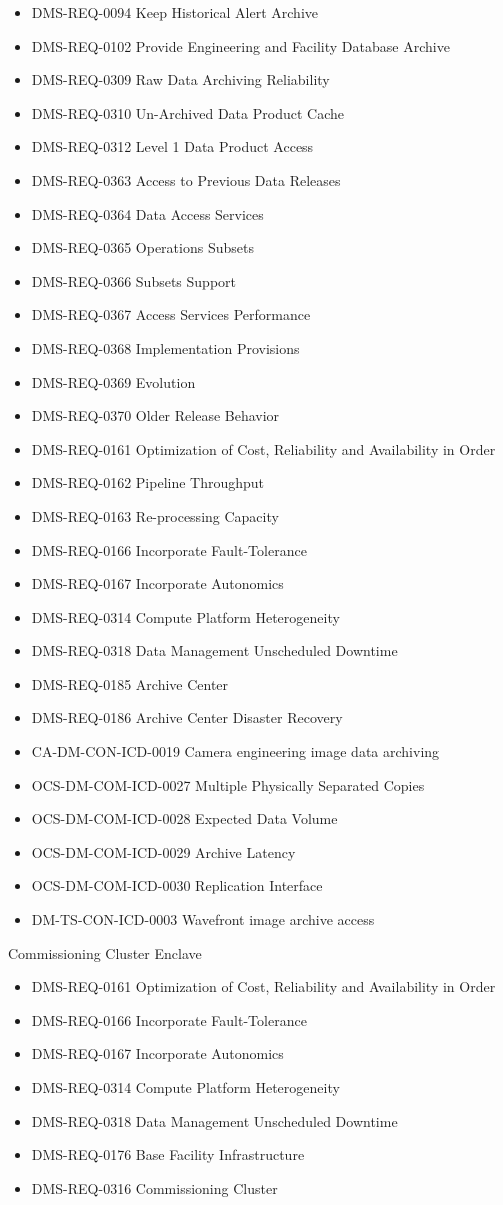 \begin{itemize}
\item DMS-REQ-0094 Keep Historical Alert Archive
\item DMS-REQ-0102 Provide Engineering and Facility Database Archive
\item DMS-REQ-0309 Raw Data Archiving Reliability
\item DMS-REQ-0310 Un-Archived Data Product Cache
\item DMS-REQ-0312 Level 1 Data Product Access
\item DMS-REQ-0363 Access to Previous Data Releases
\item DMS-REQ-0364 Data Access Services
\item DMS-REQ-0365 Operations Subsets
\item DMS-REQ-0366 Subsets Support
\item DMS-REQ-0367 Access Services Performance
\item DMS-REQ-0368 Implementation Provisions
\item DMS-REQ-0369 Evolution
\item DMS-REQ-0370 Older Release Behavior
\item DMS-REQ-0161 Optimization of Cost, Reliability and Availability in Order
\item DMS-REQ-0162 Pipeline Throughput
\item DMS-REQ-0163 Re-processing Capacity
\item DMS-REQ-0166 Incorporate Fault-Tolerance
\item DMS-REQ-0167 Incorporate Autonomics
\item DMS-REQ-0314 Compute Platform Heterogeneity
\item DMS-REQ-0318 Data Management Unscheduled Downtime
\item DMS-REQ-0185 Archive Center
\item DMS-REQ-0186 Archive Center Disaster Recovery
\item CA-DM-CON-ICD-0019 Camera engineering image data archiving
\item OCS-DM-COM-ICD-0027 Multiple Physically Separated Copies
\item OCS-DM-COM-ICD-0028 Expected Data Volume
\item OCS-DM-COM-ICD-0029 Archive Latency
\item OCS-DM-COM-ICD-0030 Replication Interface
\item DM-TS-CON-ICD-0003 Wavefront image archive access
\end{itemize}
Commissioning Cluster Enclave \begin{itemize}
\item DMS-REQ-0161 Optimization of Cost, Reliability and Availability in Order
\item DMS-REQ-0166 Incorporate Fault-Tolerance
\item DMS-REQ-0167 Incorporate Autonomics
\item DMS-REQ-0314 Compute Platform Heterogeneity
\item DMS-REQ-0318 Data Management Unscheduled Downtime
\item DMS-REQ-0176 Base Facility Infrastructure
\item DMS-REQ-0316 Commissioning Cluster
\end{itemize}
